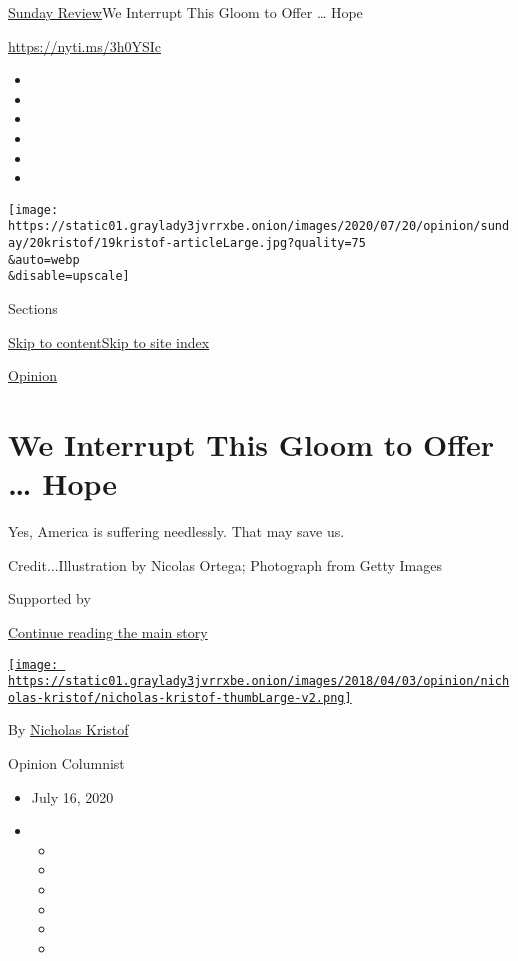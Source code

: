 \href{/section/opinion/sunday}{Sunday Review}\textbar{}We Interrupt This
Gloom to Offer \ldots{} Hope

\url{https://nyti.ms/3h0YSIc}

\begin{itemize}
\item
\item
\item
\item
\item
\item
\end{itemize}

\texttt{[image: https://static01.graylady3jvrrxbe.onion/images/2020/07/20/opinion/sunday/20kristof/19kristof-articleLarge.jpg?quality=75\\\&auto=webp\\\&disable=upscale]}

Sections

\protect\hyperlink{site-content}{Skip to
content}\protect\hyperlink{site-index}{Skip to site index}

\href{/section/opinion}{Opinion}

\hypertarget{we-interrupt-this-gloom-to-offer--hope}{%
\section{We Interrupt This Gloom to Offer \ldots{}
Hope}\label{we-interrupt-this-gloom-to-offer--hope}}

Yes, America is suffering needlessly. That may save us.

Credit...Illustration by Nicolas Ortega; Photograph from Getty Images

Supported by

\protect\hyperlink{after-sponsor}{Continue reading the main story}

\href{https://www.nytimes3xbfgragh.onion/column/nicholas-kristof}{\texttt{[image: https://static01.graylady3jvrrxbe.onion/images/2018/04/03/opinion/nicholas-kristof/nicholas-kristof-thumbLarge-v2.png]}}

By
\href{https://www.nytimes3xbfgragh.onion/column/nicholas-kristof}{Nicholas
Kristof}

Opinion Columnist

\begin{itemize}
\item
  July 16, 2020
\item
  \begin{itemize}
  \item
  \item
  \item
  \item
  \item
  \item
  \end{itemize}
\end{itemize}

